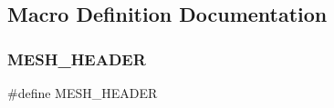\subsection{Macro Definition Documentation}
\mbox{\label{_mesh_8hpp_a02fdf56400d81dadec87ff681fcbee20}} 
\subsubsection{MESH\_HEADER}
{\footnotesize\ttfamily \#define M\+E\+S\+H\+\_\+\+H\+E\+A\+D\+ER}


